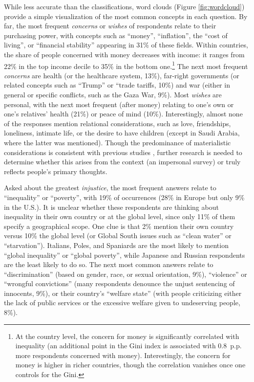 \documentclass[12pt,english]{article}
\begin{document}
\begin{bibunit}
While less accurate than the classifications, word clouds (Figure \ref{fig:wordcloud}) provide a simple visualization of the most common concepts in each question. By far, the most frequent \textit{concerns} or \textit{wishes} of respondents relate to their purchasing power, with concepts such as ``money'', ``inflation'', the ``cost of living'', or ``financial stability'' appearing in 31\% of these fields. Within countries, the share of people concerned with money decreases with income: it ranges from 22\% in the top income decile to 35\% in the bottom one.\footnote{At the country level, the concern for money is significantly correlated with inequality (an additional point in the Gini index is associated with 0.8~p.p. more respondents concerned with money). %
Interestingly, the concern for money is higher in richer countries, though the correlation vanishes once one controls for the Gini.} 
The next most frequent \textit{concerns} are health (or the healthcare system, 13\%), far-right governments (or related concepts such as ``Trump'' or ``trade tariffs, 10\%) and war (either in general or specific conflicts, such as the Gaza War, 9\%). Most \textit{wishes} are personal, with the next most frequent (after money) relating to one's own or one's relatives' health (21\%) or peace of mind (10\%). Interestingly, almost none of the responses mention relational considerations, such as love, friendships, loneliness, intimate life, or the desire to have children (except in Saudi Arabia, where the latter was mentioned). %
Though the predominance of materialistic considerations is consistent with previous studies \citep{wlezien_salience_2005,singer_who_2011}, further research is needed to determine whether this arises from the context (an impersonal survey) or truly reflects people's primary thoughts. 



Asked about the greatest \textit{injustice}, the most frequent answers relate to ``inequality'' or ``poverty'', with 19\% of occurrences (28\% in Europe but only 9\% in the U.S.). It is unclear whether these respondents are thinking about inequality in their own country or at the global level, since only 11\% of them specify a geographical scope. One clue is that 2\% mention their own country versus 10\% the global level (or Global South issues such as ``clean water'' or ``starvation''). Italians, Poles, and Spaniards are the most likely to mention ``global inequality'' or ``global poverty'', while Japanese and Russian respondents are the least likely to do so. 
The next most common answers relate to ``discrimination'' (based on gender, race, or sexual orientation, 9\%), ``violence'' or ``wrongful convictions'' (many respondents denounce the unjust sentencing of innocents, 9\%), or their country's ``welfare state'' (with people criticizing either the lack of public services or the excessive welfare given to undeserving people, 8\%). 


\end{bibunit}
\end{document}
